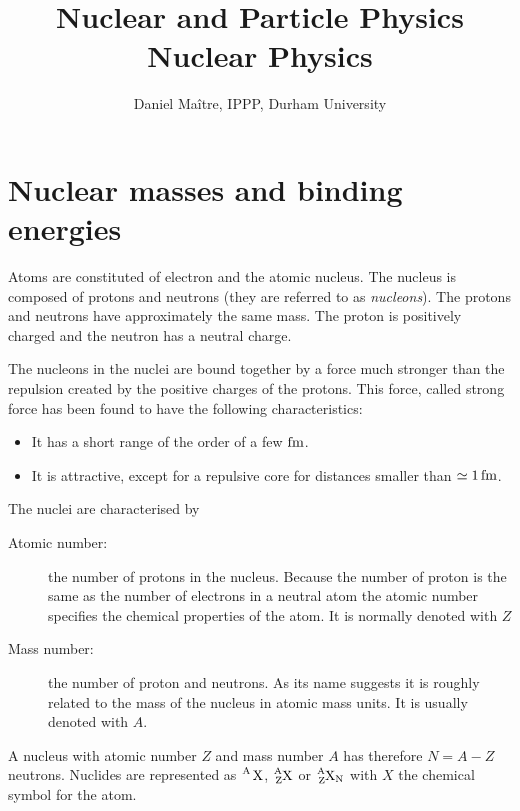 \documentclass[12pt]{article}
\date{}
\title{\LARGE \bf Nuclear and Particle Physics\\[5mm]Nuclear Physics}
\author{Daniel Ma\^{i}tre, IPPP, Durham University}
\begin{document}
\maketitle
%
%
%
%
\section{Nuclear masses and binding energies}
%
%
%
%
%
%
Atoms are constituted of electron and the atomic nucleus. The nucleus is composed of protons and neutrons (they are referred to as \emph{nucleons}). The protons and neutrons have approximately the same mass. The proton is positively charged and the neutron has a neutral charge.


The nucleons in the nuclei are bound together by a force much stronger than the repulsion created by the positive charges of the protons. This force, called strong force has been found to have the following characteristics: 
\begin{itemize}
\item It has a short range of the order of a few $\rm fm$.
\item It is attractive, except for a repulsive core for distances smaller than $\simeq 1\,\rm fm$. 
\end{itemize}  

The nuclei are characterised by
\begin{description} 
\item[Atomic number:] the number of protons in the nucleus. Because the number of proton is the same as the number of electrons in a neutral atom the atomic number specifies the chemical properties of the atom. It is normally denoted with $Z$   
\item[Mass number:] the number of proton and neutrons. As its name suggests it is roughly related to the mass of the nucleus in atomic mass units. It is usually denoted with $A$.
\end{description}



A nucleus with atomic number $Z$ and mass number $A$ has therefore $N=A-Z$ neutrons. Nuclides are represented as $\ce{^{A} X}$, $\ce{^{A}_{Z}X}$ or $\ce{^{A}_{Z}X_{N}}$ with $X$ the chemical symbol for the atom. 
\end{document}
